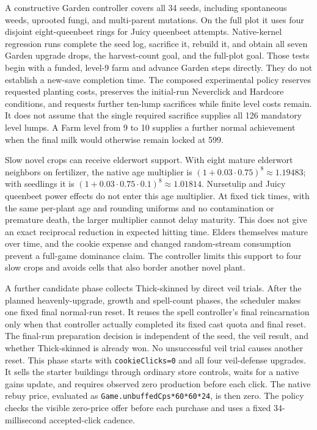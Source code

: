 \documentclass[11pt,a4paper]{article}
\numberwithin{equation}{section}
\theoremstyle{definition}
\theoremstyle{remark}
\begin{document}
A constructive Garden controller covers all 34 seeds, including spontaneous weeds, uprooted fungi, and multi-parent mutations. On the full plot it uses four disjoint eight-queenbeet rings for Juicy queenbeet attempts. Native-kernel regression runs complete the seed log, sacrifice it, rebuild it, and obtain all seven Garden upgrade drops, the harvest-count goal, and the full-plot goal. Those tests begin with a funded, level-9 farm and advance Garden steps directly. They do not establish a new-save completion time. The composed experimental policy reserves requested planting costs, preserves the initial-run Neverclick and Hardcore conditions, and requests further ten-lump sacrifices while finite level costs remain. It does not assume that the single required sacrifice supplies all 126 mandatory level lumps. A Farm level from 9 to 10 supplies a further normal achievement when the final milk would otherwise remain locked at 599.

Slow novel crops can receive elderwort support. With eight mature elderwort neighbors on fertilizer, the native age multiplier is $(1+0.03\cdot0.75)^8\approx1.19483$; with seedlings it is $(1+0.03\cdot0.75\cdot0.1)^8\approx1.01814$. Nursetulip and Juicy queenbeet power effects do not enter this age multiplier. At fixed tick times, with the same per-plant age and rounding uniforms and no contamination or premature death, the larger multiplier cannot delay maturity. This does not give an exact reciprocal reduction in expected hitting time. Elders themselves mature over time, and the cookie expense and changed random-stream consumption prevent a full-game dominance claim. The controller limits this support to four slow crops and avoids cells that also border another novel plant.

A further candidate phase collects Thick-skinned by direct veil trials. After the planned heavenly-upgrade, growth and spell-count phases, the scheduler makes one fixed final normal-run reset. It reuses the spell controller's final reincarnation only when that controller actually completed its fixed cast quota and final reset. The final-run preparation decision is independent of the seed, the veil result, and whether Thick-skinned is already won. No unsuccessful veil trial causes another reset. This phase starts with \texttt{cookieClicks=0} and all four veil-defense upgrades. It sells the starter buildings through ordinary store controls, waits for a native gains update, and requires observed zero production before each click. The native rebuy price, evaluated as \texttt{Game.unbuffedCps*60*60*24}, is then zero. The policy checks the visible zero-price offer before each purchase and uses a fixed 34-millisecond accepted-click cadence.
\end{document}
